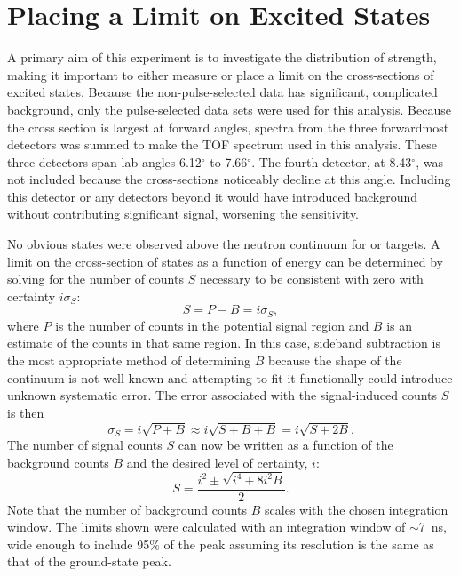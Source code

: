 \section{Placing a Limit on Excited \zp States}

A primary aim of this experiment is to investigate the distribution of \zp strength, making it important to either measure or place a limit on the cross-sections of excited \zp states.  Because the non-pulse-selected data has significant, complicated background, only the pulse-selected data sets were used for this analysis.  Because the \zp cross section is largest at forward angles, spectra from the three forwardmost detectors was summed to make the TOF spectrum used in this analysis.  These three detectors span lab angles 6.12$^{\circ}$ to 7.66$^{\circ}$.  The fourth detector, at 8.43$^{\circ}$, was not included because the \zp cross-sections noticeably decline at this angle.  Including this detector or any detectors beyond it would have introduced background without contributing significant signal, worsening the sensitivity.    

No obvious \zp states were observed above the neutron continuum for  or  targets.  A limit on the cross-section of \zp states as a function of energy can be determined by solving for the number of counts $S$ necessary to be consistent with zero with certainty $i\sigma_S$:
\begin{equation}
S = P - B = i\sigma_S,
\end{equation}
where $P$ is the number of counts in the potential signal region and $B$ is an estimate of the counts in that same region.  In this case, sideband subtraction is the most appropriate method of determining $B$ because the shape of the continuum is not well-known and attempting to fit it functionally could introduce unknown systematic error.  The error associated with the signal-induced counts $S$ is then
\begin{equation}
\sigma_S = i\sqrt{P+B} \approx i\sqrt{S+B+B} = i\sqrt{S+2B}.
\end{equation}
The number of signal counts $S$ can now be written as a function of the background counts $B$ and the desired level of certainty, $i$:
\begin{equation}
S = \frac{i^2 \pm \sqrt{i^4 + 8i^2B}}{2}.
\end{equation}
Note that the number of background counts $B$ scales with the chosen integration window.  The limits shown were calculated with an integration window of $\sim$7~ns, wide enough to include 95\% of the peak assuming its resolution is the same as that of the ground-state peak.

